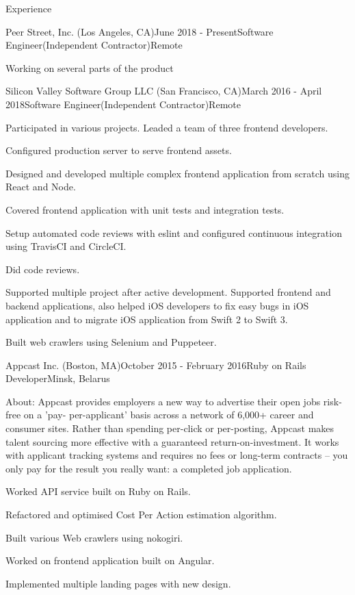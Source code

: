 \documentclass{resume}
\begin{document}
  
  \begin{rSection}{Experience}
    \begin{rSubsection}{Peer Street, Inc. (Los Angeles, CA)}{June 2018 - Present}{Software Engineer(Independent Contractor)}{Remote}
    \item Working on several parts of the product
    \end{rSubsection}
  
    \begin{rSubsection}{Silicon Valley Software Group LLC (San Francisco, CA)}{March 2016 - April 2018}{Software Engineer(Independent Contractor)}{Remote}      
    \item Participated in various projects. Leaded a team of three frontend developers. 
    \item Configured production server to serve frontend assets. 
    \item Designed and developed multiple complex frontend application from scratch using React and Node. 
    \item Covered frontend application with unit tests and integration tests.
    \item Setup automated code reviews with eslint and configured continuous integration using TravisCI and CircleCI.
    \item Did code reviews.
    \item Supported multiple project after active development. Supported frontend and backend applications, also helped iOS developers to fix easy bugs in iOS application and to migrate iOS application from Swift 2 to Swift 3.
    \item Built web crawlers using Selenium and Puppeteer.
    \end{rSubsection}
  
    \begin{rSubsection}{Appcast Inc. (Boston, MA)}{October 2015 - February 2016}{Ruby on Rails Developer}{Minsk, Belarus}
    \item About: Appcast provides employers a new way to advertise their open jobs risk-free on a 'pay- per-applicant' basis across a network of 6,000+ career and consumer sites. Rather than spending per-click or per-posting, Appcast makes talent sourcing more effective with a guaranteed return-on-investment. It works with applicant tracking systems and requires no fees or long-term contracts – you only pay for the result you really want: a completed job application.
    \item Worked API service built on Ruby on Rails. 
    \item Refactored and optimised Cost Per Action estimation algorithm.
    \item Built various Web crawlers using nokogiri.
    \item Worked on frontend application built on Angular.
    \item Implemented multiple landing pages with new design.
    \end{rSubsection}


\end{rSection}
\end{document}
